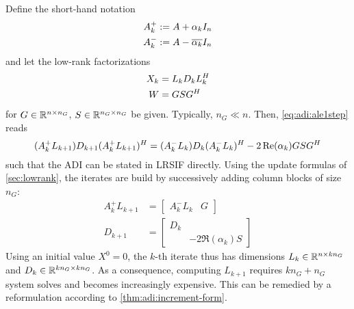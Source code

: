 Define the short-hand notation
\begin{equation}
\label{eq:adi:ale:shorthand}
\begin{aligned}
  A^+_k &:= A + \alpha_k I_n \\
  A^-_k &:= A - \conj{\alpha_k} I_n
\end{aligned}
\end{equation}
and let the low-rank factorizations
\begin{equation}
\begin{aligned}
  X_k &= L_k D_k L_k^H \\
  W &= GSG^H
\end{aligned}
\end{equation}
for $G\in\mathbb{R}^{n\times n_G}$, $S\in\mathbb{R}^{n_G\times n_G}$ be given.
Typically, $n_G \ll n$.
Then, \eqref{eq:adi:ale1step} reads
\begin{equation}
  (A_k^+ L_{k+1}) D_{k+1} (A_k^+ L_{k+1})^H
  = (A_k^- L_k) D_k (A_k^- L_k)^H - 2\operatorname{Re}(\alpha_k) GSG^H
\end{equation}
such that
the \ac{ADI} can be stated in \ac{LRSIF} directly.
Using the update formulas of \autoref{sec:lowrank},
the iterates are build by successively adding column blocks of size $n_G$:
\begin{equation}
\begin{aligned}
  A_k^+ L_{k+1} &= \begin{bmatrix}
    A^-_k L_k &
    G
  \end{bmatrix} \\
  D_{k+1} &= \begin{bmatrix}
    D_k \\
    & -2\Re(\alpha_k) S
  \end{bmatrix}
\end{aligned}
\end{equation}
Using an initial value $X^0=0$,
the $k$-th iterate thus has dimensions $L_k \in\mathbb{R}^{n\times kn_G}$ and $D_k \in\mathbb{R}^{kn_G\times kn_G}$.
As a consequence, computing $L_{k+1}$
requires $kn_G + n_G$ system solves and
becomes increasingly expensive.
This can be remedied by a reformulation according to \autoref{thm:adi:increment-form}.

